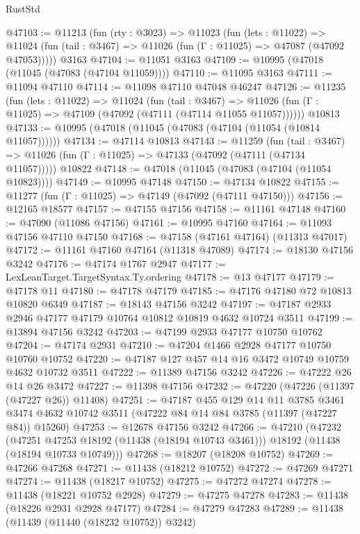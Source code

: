 \begin{lexlean}{RustStd}
\begin{coremodule}
@47103 := @11213
    (fun (rty : @3023) =>
    @11023
      (fun (lets : @11022) =>
      @11024 (fun (tail : @3467) => @11026 (fun (Γ : @11025) => @47087 (@47092 @47053)))))
    @3163
@47104 := @11051 @3163
@47109 := @10995 (@47018 (@11045 (@47083 (@47104 @11059))))
@47110 := @11095 @3163
@47111 := @11094 @47110
@47114 := @11098 @47110 @47048 @46247
@47126 := @11235
    (fun (lets : @11022) =>
    @11024
      (fun (tail : @3467) =>
      @11026 (fun (Γ : @11025) => @47109 (@47092 (@47111 (@47114 @11055 @11057))))))
    @10813
@47133 := @10995 (@47018 (@11045 (@47083 (@47104 (@11054 (@10814 @11057))))))
@47134 := @47114 @10813
@47143 := @11259
    (fun (tail : @3467) => @11026 (fun (Γ : @11025) => @47133 (@47092 (@47111 (@47134 @11057)))))
    @10822
@47148 := @47018 (@11045 (@47083 (@47104 (@11054 @10823))))
@47149 := @10995 @47148
@47150 := @47134 @10822
@47155 := @11277 (fun (Γ : @11025) => @47149 (@47092 (@47111 @47150)))
@47156 := @12165 @18577
@47157 := @47155 @47156
@47158 := @11161 @47148
@47160 := @47090 (@11086 @47156)
@47161 := @10995 @47160
@47164 := @11093 @47156 @47110 @47150
@47168 := @47158 (@47161 @47164) (@11313 @47017)
@47172 := @11161 @47160 @47164 (@11318 @47089)
@47174 := @18130 @47156 @3242
@47176 := @47174 @1767 @2947
@47177 := LexLeanTarget.TargetSyntax.Ty.ordering
@47178 := @13 @47177
@47179 := @47178 @11
@47180 := @47178 @47179
@47185 := @47176 @47180 @72 @10813 @10820 @6349
@47187 := @18143 @47156 @3242
@47197 := @47187 @2933 @2946 @47177 @47179 @10764 @10812 @10819 @4632 @10724 @3511
@47199 := @13894 @47156 @3242
@47203 := @47199 @2933 @47177 @10750 @10762
@47204 := @47174 @2931
@47210 := @47204 @1466 @2928 @47177 @10750 @10760 @10752
@47220 := @47187 @127 @457 @14 @16 @3472 @10749 @10759 @4632 @10732 @3511
@47222 := @11389 @47156 @3242
@47226 := @47222 @26 @14 @26 @3472
@47227 := @11398 @47156
@47232 := @47220 (@47226 (@11397 (@47227 @26)) @11408)
@47251 := @47187
    @455
    @129
    @14
    @11
    @3785
    @3461
    @3474
    @4632
    @10742
    @3511
    (@47222 @84 @14 @84 @3785 (@11397 (@47227 @84)) @15260)
@47253 := @12678 @47156 @3242
@47266 := @47210
    (@47232
      (@47251 @47253 @18192 (@11438 (@18194 @10743 @3461)))
      @18192
      (@11438 (@18194 @10733 @10749)))
@47268 := @18207 (@18208 @10752)
@47269 := @47266 @47268
@47271 := @11438 (@18212 @10752)
@47272 := @47269 @47271
@47274 := @11438 (@18217 @10752)
@47275 := @47272 @47274
@47278 := @11438 (@18221 @10752 @2928)
@47279 := @47275 @47278
@47283 := @11438 (@18226 @2931 @2928 @47177)
@47284 := @47279 @47283
@47289 := @11438 (@11439 (@11440 (@18232 @10752)) @3242)

\end{coremodule}
\end{lexlean}
